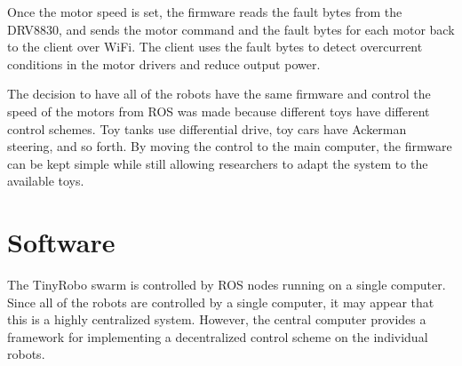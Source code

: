 \documentclass[]{article}
\begin{document}
Once the motor speed is set, the firmware reads the fault bytes from the DRV8830, and sends the motor command and the fault bytes for each motor back to the client over WiFi. 
The client uses the fault bytes to detect overcurrent conditions in the motor drivers and reduce output power. 

The decision to have all of the robots have the same firmware and control the speed of the motors from ROS was made because different toys have different control schemes. 
Toy tanks use differential drive, toy cars have Ackerman steering, and so forth. 
By moving the control to the main computer, the firmware can be kept simple while still allowing researchers to adapt the system to the available toys. 

\section{Software}

The TinyRobo swarm is controlled by ROS nodes running on a single computer.
Since all of the robots are controlled by a single computer, it may appear that this is a highly centralized system. 
However, the central computer provides a framework for implementing a decentralized control scheme on the individual robots. 
\end{document}
